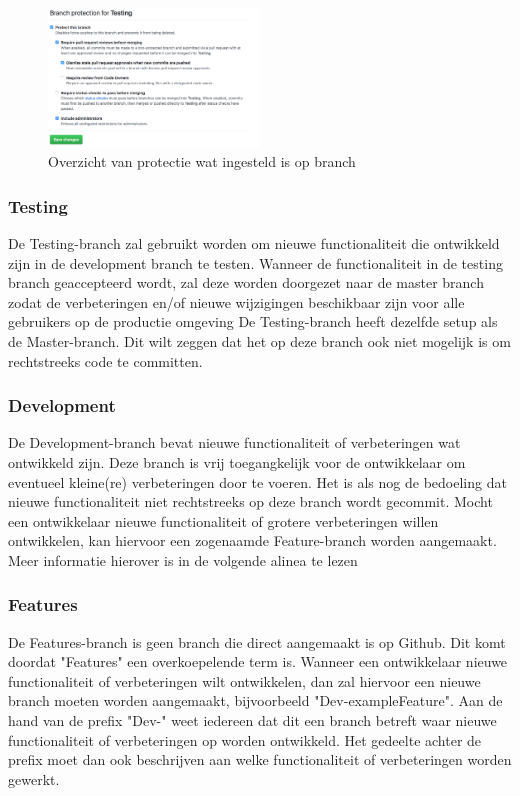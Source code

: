 \documentclass{article}
\begin{document}
	
	\begin{figure}[H]
	\includegraphics[width=0.5\textwidth]{images/BranchProtectionSetup.png}
	\caption{Overzicht van protectie wat ingesteld is op branch}
	\label{fig:BranchProtectionSetup}
	\end{figure}
	
	\subsubsection{Testing}
	De Testing-branch zal gebruikt worden om nieuwe functionaliteit die ontwikkeld zijn in de development branch te testen. Wanneer de functionaliteit in de testing branch geaccepteerd wordt, zal deze worden doorgezet naar de master branch zodat de verbeteringen en/of nieuwe wijzigingen beschikbaar zijn voor alle gebruikers op de productie omgeving
	De Testing-branch heeft dezelfde setup als de Master-branch. Dit wilt zeggen dat het op deze branch ook niet mogelijk is om rechtstreeks code te committen.
	\subsubsection{Development}
	
	De Development-branch bevat nieuwe functionaliteit of verbeteringen wat ontwikkeld zijn. Deze branch is vrij toegangkelijk voor de ontwikkelaar om eventueel kleine(re) verbeteringen door te voeren.	
	Het is als nog de bedoeling dat nieuwe functionaliteit niet rechtstreeks op deze branch wordt gecommit. Mocht een ontwikkelaar nieuwe functionaliteit of grotere verbeteringen willen ontwikkelen, kan hiervoor een zogenaamde Feature-branch worden aangemaakt. Meer informatie hierover is in de volgende alinea te lezen
	
	\subsubsection{Features}
	De Features-branch is geen branch die direct aangemaakt is op Github. Dit komt doordat "Features" een overkoepelende term is. Wanneer een ontwikkelaar nieuwe functionaliteit of verbeteringen wilt ontwikkelen, dan zal hiervoor een nieuwe branch moeten worden aangemaakt, bijvoorbeeld "Dev-exampleFeature". Aan de hand van de prefix "Dev-" weet iedereen dat dit een branch betreft waar nieuwe functionaliteit of verbeteringen op worden ontwikkeld. Het gedeelte achter de prefix moet dan ook beschrijven aan welke functionaliteit of verbeteringen worden gewerkt.
	
\end{document}
